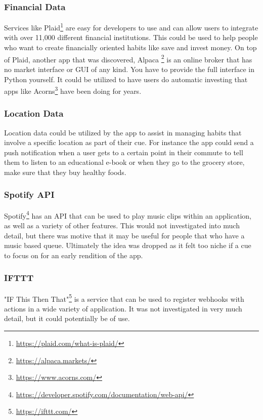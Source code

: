 \subsubsection{Financial Data}
Services like Plaid\footnote{\url{https://plaid.com/what-is-plaid/}} are easy for developers to use and can allow users to integrate with over 11,000 different financial institutions. This could be used to help people who want to create financially oriented habits like save and invest money. On top of Plaid, another app that was discovered, Alpaca \footnote{\url{https://alpaca.markets/}} is an online broker that has no market interface or GUI of any kind. You have to provide the full interface in Python yourself. It could be utilized to have users do automatic investing that apps like Acorns\footnote{\url{https://www.acorns.com/}} have been doing for years.
\subsubsection{Location Data}
Location data could be utilized by the app to assist in managing habits that involve a specific location as part of their cue. For instance the app could send a push notification when a user gets to a certain point in their commute to tell them to listen to an educational e-book or when they go to the grocery store, make sure that they buy healthy foods.
\subsubsection{Spotify API}
Spotify\footnote{\url{https://developer.spotify.com/documentation/web-api/}} has an API that can be used to play music clips within an application, as well as a variety of other features. This would not investigated into much detail, but there was motive that it may be useful for people that who have a music based queue. Ultimately the idea was dropped as it felt too niche if a cue to focus on for an early rendition of the app.
\subsubsection{IFTTT}
"IF This Then That"\footnote{\url{https://ifttt.com/}} is a service that can be used to register webhooks with actions in a wide variety of application. It was not investigated in very much detail, but it could potentially be of use. 